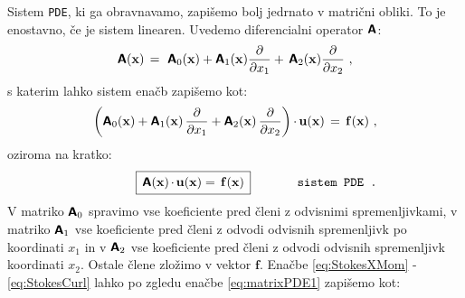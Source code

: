 Sistem \texttt{PDE}, ki ga obravnavamo, zapišemo bolj jedrnato v matrični obliki. To je enostavno, če je sistem linearen. Uvedemo diferencialni operator $\bm{\mathsf{A}}$:
\begin{equation}
	\mathbsf{A}(\mathbf{x}) \, = \ \mathbsf{A}_0(\mathbf{x}) + \mathbsf{A}_1(\mathbf{x}) \frac{\pd}{\pd x_1} + \, \mathbsf{A}_2(\mathbf{x}) \frac{\pd}{\pd x_2} \ ,
	\label{eq:AMatrixDefinition}
	\vspace{-1mm}
\end{equation}
\vspace{1mm}
s katerim lahko sistem enačb zapišemo kot:
\begin{equation}
	\left(\mathbsf{A}_0(\mathbf{x}) + \mathbsf{A}_1(\mathbf{x}) \, \frac{\pd}{\pd x_1} + \mathbsf{A}_2(\mathbf{x}) \, \frac{\pd}{\pd x_2}\right) \mkern-1mu \cdot \mkern-1mu \mathbf{u}(\mathbf{x}) \, = \, \mathbf{f}(\mathbf{x}) \ ,
	\label{eq:matrixPDE1}
	\vspace{-1mm}
\end{equation}
oziroma na kratko:
\vspace{2mm}
\begin{equation}
	\hspace{12mm} \boxed{
		\, \vphantom{\big(} \mathbsf{A}(\mathbf{x}) \mkern-1.5mu \cdot \mkern-1.5mu \mathbf{u}(\mathbf{x}) = \, \mathbf{f}(\mathbf{x}) \,
	}\hspace{1.3cm} \texttt{sistem PDE .}
	\label{eq:compactPDE}
	\vspace{1.5mm}
\end{equation}
V matriko $\bm{\mathsf{A}}_0$ spravimo vse koeficiente pred členi z odvisnimi spremenljivkami, v matriko $\bm{\mathsf{A}}_1$ vse koeficiente pred členi z odvodi odvisnih spremenljivk po koordinati $x_1$ in v $\bm{\mathsf{A}}_2$ vse koeficiente pred členi z odvodi odvisnih spremenljivk koordinati $x_2$. Ostale člene zložimo v vektor $\mathbf{f}$. Enačbe \eqref{eq:StokesXMom} - \eqref{eq:StokesCurl} lahko po zgledu enačbe \eqref{eq:matrixPDE1} zapišemo kot:
\vspace{1.5mm}
